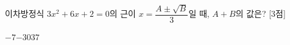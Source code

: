 이차방정식 $3x^2+6x+2=0$의 근이 $x=\dfrac{A\pm\sqrt{B}}{3}$일 때, $A+B$의 값은?  \mbox{[3점]}
\begin{choices32}{$-7$}{$-3$}{$0$}{$3$}{$7$}\end{choices32}
